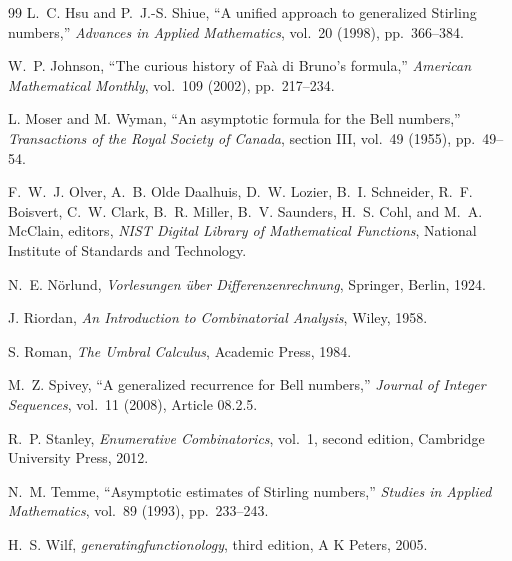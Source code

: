 \documentclass[11pt,a4paper,oneside,openany]{book}
\theoremstyle{definition}
\theoremstyle{remark}
\begin{document}
\begin{thebibliography}{99}
L.~C. Hsu and P.~J.-S. Shiue,
``A unified approach to generalized Stirling numbers,''
\emph{Advances in Applied Mathematics}, vol.~20 (1998), pp.~366--384.

W.~P. Johnson,
``The curious history of Fa\`a di Bruno's formula,''
\emph{American Mathematical Monthly}, vol.~109 (2002), pp.~217--234.

L. Moser and M. Wyman,
``An asymptotic formula for the Bell numbers,''
\emph{Transactions of the Royal Society of Canada}, section III, vol.~49
(1955), pp.~49--54.

F.~W.~J. Olver, A.~B. Olde Daalhuis, D.~W. Lozier, B.~I. Schneider,
R.~F. Boisvert, C.~W. Clark, B.~R. Miller, B.~V. Saunders,
H.~S. Cohl, and M.~A. McClain, editors,
\emph{NIST Digital Library of Mathematical Functions},
National Institute of Standards and Technology.

N.~E. N\"orlund,
\emph{Vorlesungen \"uber Differenzenrechnung},
Springer, Berlin, 1924.

J. Riordan,
\emph{An Introduction to Combinatorial Analysis},
Wiley, 1958.

S. Roman,
\emph{The Umbral Calculus},
Academic Press, 1984.

M.~Z. Spivey,
``A generalized recurrence for Bell numbers,''
\emph{Journal of Integer Sequences}, vol.~11 (2008), Article 08.2.5.

R.~P. Stanley,
\emph{Enumerative Combinatorics}, vol.~1, second edition,
Cambridge University Press, 2012.

N.~M. Temme,
``Asymptotic estimates of Stirling numbers,''
\emph{Studies in Applied Mathematics}, vol.~89 (1993), pp.~233--243.

H.~S. Wilf,
\emph{generatingfunctionology}, third edition,
A K Peters, 2005.

\end{thebibliography}

\printindex
\end{document}
